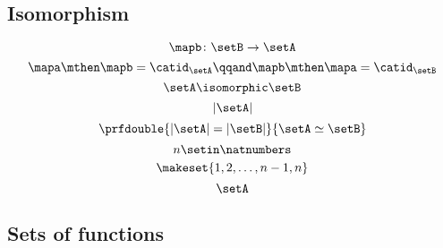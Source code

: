 \begin{forslides}
    \subsection{Isomorphism}

    \begin{equation}
        \label{eq:slides_session2_148}
        \mapb \colon \setB \to \setA
    \end{equation}
    \begin{equation}
        \label{eq:slides_session2_149}
        \mapa \mthen \mapb = \catid_\setA
        \qqand
        \mapb \mthen \mapa = \catid_\setB
    \end{equation}
    \begin{equation}
        \label{eq:slides_session2_150}
        \setA \isomorphic \setB
    \end{equation}
    \begin{equation}
        \label{eq:slides_session2_151}
        \vert \setA \vert
    \end{equation}
    \begin{equation}
        \label{eq:slides_session2_152}
        \prfdouble{ \vert \setA \vert = \vert \setB \vert }{ \setA \simeq \setB }
    \end{equation}
    \begin{equation}
        \label{eq:slides_session2_153}
        n \setin \natnumbers
    \end{equation}
    \begin{equation}
        \label{eq:slides_session2_154}
        \makeset{1,2, \dots, n-1, n}
    \end{equation}
    \begin{equation}
        \label{eq:slides_session2_155}
        \setA
    \end{equation}

    \subsection{Sets of functions}


\end{forslides}
